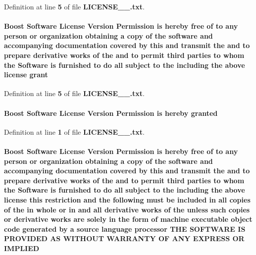 Definition at line {\bf 5} of file {\bf L\+I\+C\+E\+N\+S\+E\+\_\+\_.\+txt}.

\paragraph[{grant}]{\setlength{\rightskip}{0pt plus 5cm}Boost {\bf Software} License Version Permission is hereby free of to any person or organization obtaining a copy of the software and accompanying documentation covered by this and transmit the and to prepare derivative works of the and to permit third parties to whom the {\bf Software} is furnished to do {\bf all} subject to the including the above {\bf license} grant}\label{LICENSE__1__0_8txt_ad246752787b1288cbd02361cfc35bbfc}


Definition at line {\bf 5} of file {\bf L\+I\+C\+E\+N\+S\+E\+\_\+\_.\+txt}.

\paragraph[{granted}]{\setlength{\rightskip}{0pt plus 5cm}Boost {\bf Software} License Version Permission is hereby granted}\label{LICENSE__1__0_8txt_a1e036d527c88948b88a0f71e07419bd5}


Definition at line {\bf 1} of file {\bf L\+I\+C\+E\+N\+S\+E\+\_\+\_.\+txt}.

\paragraph[{I\+M\+P\+L\+I\+ED}]{\setlength{\rightskip}{0pt plus 5cm}Boost {\bf Software} License Version Permission is hereby free of to any person or organization obtaining a copy of the software and accompanying documentation covered by this and transmit the and to prepare derivative works of the and to permit third parties to whom the {\bf Software} is furnished to do {\bf all} subject to the including the above {\bf license} this restriction and the {\bf following} must be included in {\bf all} copies of the in whole or in and {\bf all} derivative works of the unless such copies or derivative works are solely in the form of machine executable object code generated by a source language processor T\+HE S\+O\+F\+T\+W\+A\+RE {\bf IS} P\+R\+O\+V\+I\+D\+ED AS W\+I\+T\+H\+O\+UT W\+A\+R\+R\+A\+N\+TY OF A\+NY E\+X\+P\+R\+E\+SS OR I\+M\+P\+L\+I\+ED}\label{LICENSE__1__0_8txt_acd8df50187a722da3f67c9f4b01a1572}


